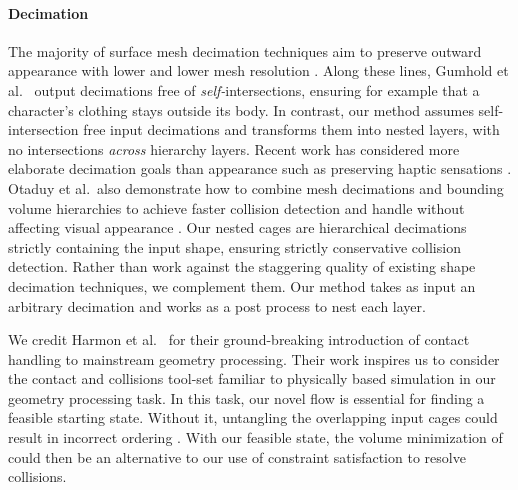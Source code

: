 \paragraph{Decimation}
%
The majority of surface mesh decimation techniques aim to preserve outward
appearance with lower and lower mesh resolution
\cite{Hoppe:1996:PM,Garland:1997:SSU,Melax98}.
%
Along these lines, Gumhold et al.\  output
decimations free of \emph{self-}intersections, ensuring for example that a
character's clothing stays outside its body.
%
In contrast, our method assumes self-intersection free input decimations and
transforms them into nested layers, with no intersections \emph{across}
hierarchy layers.
%
Recent work has considered more elaborate decimation goals than appearance such
as preserving haptic sensations \cite{Otaduy:2003:SPS}.
%
Otaduy et al.\ also demonstrate how to combine mesh decimations and bounding
volume hierarchies to achieve faster collision detection and handle without
affecting visual appearance .
%
Our nested cages are hierarchical decimations strictly containing the input
shape, ensuring strictly conservative collision detection.
%
Rather than work against the staggering quality of existing shape decimation
techniques, we complement them. Our method takes as input an arbitrary
decimation and works as a post process to nest each layer.




We credit Harmon et al.\  for their
ground-breaking introduction of contact handling to mainstream geometry
processing. Their work inspires us to consider the contact and collisions
tool-set familiar to physically based simulation in our geometry processing
task.
%
In this task, our novel flow is essential for finding a feasible starting
state.
%
Without it, untangling the overlapping input cages could result in incorrect
ordering \cite{Baraff:2003:UC}.
%
With our feasible state, the volume minimization of
\cite{ContactAwareModeling:2011} could then be an alternative to our use of
constraint satisfaction to resolve collisions.

